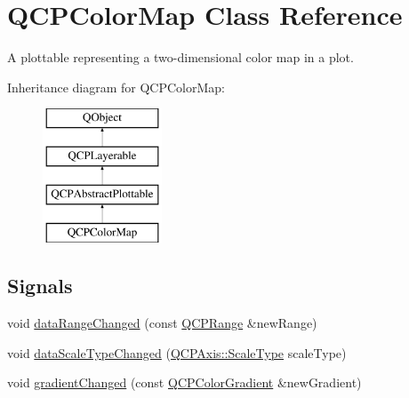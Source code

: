 \hypertarget{class_q_c_p_color_map}{}\section{Q\+C\+P\+Color\+Map Class Reference}
\label{class_q_c_p_color_map}


A plottable representing a two-\/dimensional color map in a plot.  


Inheritance diagram for Q\+C\+P\+Color\+Map\+:\begin{figure}[H]
\begin{center}
\leavevmode
\includegraphics[height=4.000000cm]{class_q_c_p_color_map}
\end{center}
\end{figure}
\subsection*{Signals}
\begin{DoxyCompactItemize}
\item 
void \hyperlink{class_q_c_p_color_map_a83ae5be3903da493f732e1a5c14fd807}{data\+Range\+Changed} (const \hyperlink{class_q_c_p_range}{Q\+C\+P\+Range} \&new\+Range)
\item 
void \hyperlink{class_q_c_p_color_map_a978d5d5c9f68cffef8c902b855c04490}{data\+Scale\+Type\+Changed} (\hyperlink{class_q_c_p_axis_a36d8e8658dbaa179bf2aeb973db2d6f0}{Q\+C\+P\+Axis\+::\+Scale\+Type} scale\+Type)
\item 
void \hyperlink{class_q_c_p_color_map_a31a12726736b1ac274e7b1d8dfb67468}{gradient\+Changed} (const \hyperlink{class_q_c_p_color_gradient}{Q\+C\+P\+Color\+Gradient} \&new\+Gradient)
\end{DoxyCompactItemize}
